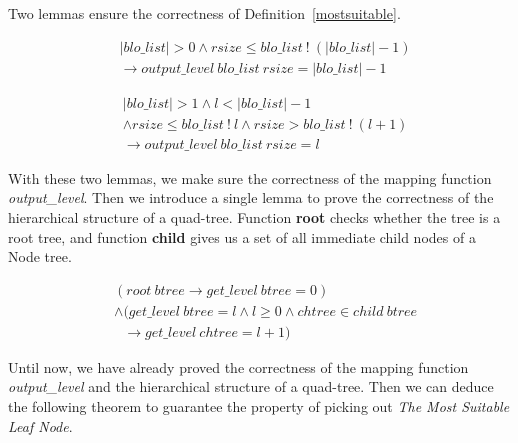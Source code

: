 Two lemmas ensure the correctness of Definition~\ref{mostsuitable}.

\begin{lemma} 
\end{lemma}
\vspace{-7pt}
{\footnotesize
\begin{align*}
&\vert blo\_list \vert > 0 \wedge rsize \leq blo\_list\ !\ (\vert blo\_list \vert - 1) \\
&\longrightarrow output\_level\ blo\_list\ rsize = \vert blo\_list \vert - 1
\end{align*}
}
\vspace{-12pt}	

\begin{lemma} 
\end{lemma}
\vspace{-7pt}
{\footnotesize
\begin{align*}
&\vert blo\_list \vert > 1 \wedge l < \vert blo\_list \vert - 1 \\
&\wedge rsize \leq blo\_list\ !\ l \wedge rsize > blo\_list\ !\ (l + 1) \\
&\longrightarrow output\_level\ blo\_list\ rsize = l
\end{align*}
}
\vspace{-12pt}

With these two lemmas, we make sure the correctness of the mapping function \emph{output\_level}. Then we introduce a single lemma to prove the correctness of the hierarchical structure of a quad-tree. Function \textbf{root} checks whether the tree is a root tree, and function \textbf{child} gives us a set of all immediate child nodes of a Node tree.

\begin{lemma} 
\end{lemma}
\vspace{-7pt}
{\footnotesize
\begin{align*}
&(root\ btree \longrightarrow get\_level\ btree = 0) \\
&\wedge (get\_level\ btree = l \wedge l \geq 0 \wedge chtree \in child\ btree \\
&\ \ \ \longrightarrow get\_level\ chtree = l + 1)
\end{align*}
}	
\vspace{-12pt}

Until now, we have already proved the correctness of the mapping function \emph{output\_level} and the hierarchical structure of a quad-tree. Then we can deduce the following theorem to guarantee the property of picking out \emph{The Most Suitable Leaf Node}.

